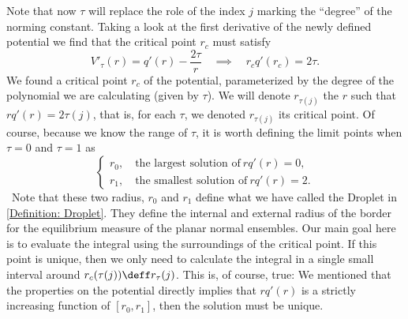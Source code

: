 Note that now $\tau$ will replace the role of the index $j$ marking the \enquote{degree} of the norming constant. Taking a look at the first derivative of the newly defined potential we find that the critical point $r_c$ must satisfy
\begin{equation}
	V'_\tau(r) = q'(r) - \frac{2\tau}{r} \quad \implies \quad r_c q'(r_c) = 2 \tau.
\end{equation}
We found a critical point $r_c$ of the potential, parameterized by the degree of the polynomial we are calculating (given by $\tau$). We will denote $r_{\tau(j)}$ the $r$ such that $ r q'(r) = 2 \tau(j)$, that is, for each $\tau$, we denoted $r_{\tau(j)}$ its critical point. Of course, because we know the range of $\tau$, it is worth defining the limit points when $\tau = 0$ and $\tau = 1$ as
\begin{equation}
	\begin{cases}
		r_0, \quad \text{the largest solution of} \ r q'(r) = 0, \\
		r_ 1, \quad \text{the smallest solution of} \ r q'(r) = 2.
	\end{cases}
\end{equation}
\
Note that these two radius, $r_0$ and $r_1$ define what we have called the Droplet in \autoref{Definition: Droplet}. They define the internal and external radius of the border for the equilibrium measure of the planar normal ensembles. Our main goal here is to evaluate the integral using the surroundings of the critical point. If this point is unique, then we only need to calculate the integral in a single small interval around $r_c(\tau(j)) \deff r_\tau(j)$. This is, of course, true: We mentioned that the properties on the potential directly implies that $r q'(r)$ is a strictly increasing function of $[r_0, r_1]$, then the solution must be unique. 

